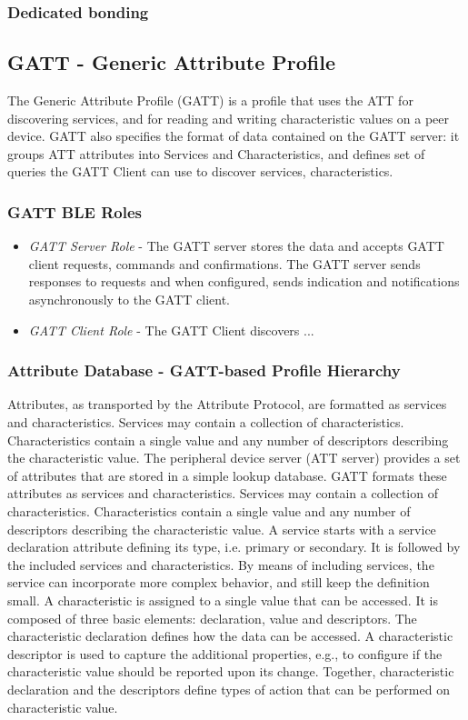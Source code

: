 \subsubsection{Dedicated bonding}


\subsection{GATT - Generic Attribute Profile}
The Generic Attribute Profile (GATT) is a profile that uses the ATT for discovering services, and for reading and writing characteristic values on a peer device. GATT also specifies the format of data contained on the GATT server: it groups ATT attributes into Services and Characteristics, and defines set of queries the GATT Client can use to discover services, characteristics.

\subsubsection{GATT BLE Roles}

\begin{itemize}
\item \emph{GATT Server Role} - The GATT server stores the data and accepts GATT client requests, commands and confirmations. The GATT server sends responses to requests and when configured, sends indication and notifications asynchronously to the GATT client. 
\item \emph{GATT Client Role} - The GATT Client discovers ...
\end{itemize}

\subsubsection{Attribute Database - GATT-based Profile Hierarchy}
Attributes, as transported by the Attribute Protocol, are formatted as services and characteristics. Services may contain a collection of characteristics. Characteristics contain a single value and any number of descriptors describing the characteristic value. The peripheral device server (ATT server) provides a set of attributes that are stored in a simple lookup database. GATT formats these attributes as services and characteristics. Services may contain a collection of characteristics. Characteristics contain a single value and any number of descriptors describing the characteristic value. A service starts with a service declaration attribute defining its type, i.e. primary or secondary. It is followed by the included services and characteristics. By means of including services, the service can incorporate more complex behavior, and still keep the definition small. A characteristic is assigned to a single value that can be accessed. It is composed of three basic elements: declaration, value and descriptors. The characteristic declaration defines how the data can be accessed. A characteristic descriptor is used to capture the additional properties, e.g., to configure if the characteristic value should be reported upon its change. Together, characteristic declaration and the descriptors define types of action that can be performed on characteristic value.

